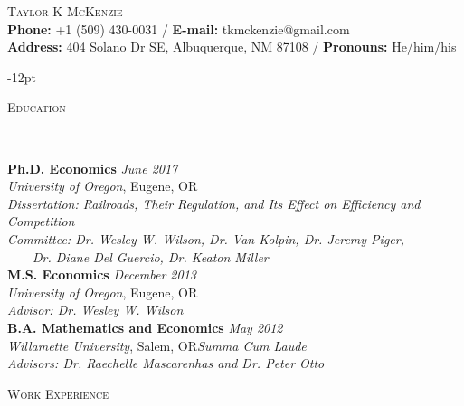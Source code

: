 \documentclass[11pt]{article}
\newenvironment{changemargin}[2]{%
  \begin{list}{}{%
    \setlength{\topsep}{0pt}%
    \setlength{\leftmargin}{#1}%
    \setlength{\rightmargin}{#2}%
    \setlength{\listparindent}{\parindent}%
    \setlength{\itemindent}{\parindent}%
    \setlength{\parsep}{\parskip}%
  }%
  \item[]}{\end{list}
}
\newcommand{\lineover}{
	\begin{changemargin}{-0.05in}{-0.05in}
		\vspace*{-8pt}
		\hrulefill \\
		\vspace*{-2pt}
	\end{changemargin}
}
\newcommand{\header}[1]{
	\begin{changemargin}{-0.5in}{-0.5in}
		\scshape{#1}\\
	\vspace*{-5pt}
  	\lineover
	\end{changemargin}
}
\newcommand{\contact}[4]{
	\begin{changemargin}{-0.5in}{-0.5in}
		\begin{center}
			{\Large \scshape {#1}}\\ \smallskip
			{#2}\\ \smallskip 
			{#3}\\ \smallskip
			{#4}\smallskip
		\end{center}
	\end{changemargin}
}
\newenvironment{body} {
	\vspace*{-16pt}
	\begin{changemargin}{-0.25in}{-0.5in}
  }	
	{\end{changemargin}
}
\begin{document}



\contact{\vspace*{-5ex}Taylor K McKenzie}{\textbf{Phone:} +1 (509) 430-0031 / \textbf{E-mail:} tkmckenzie@gmail.com}{\vspace*{-0.75ex}\textbf{Address:} 404 Solano Dr SE, Albuquerque, NM 87108 / \textbf{Pronouns:} He/him/his}

\vspace{-12pt}
\header{Education}

\begin{body}
	\vspace{14pt}
	\textbf{Ph.D. Economics}{} \hfill \emph{June 2017}{} \\
	\emph{University of Oregon}, Eugene, OR{}\\
	\emph{Dissertation: Railroads, Their Regulation, and Its Effect on Efficiency and Competition}\\
	\emph{Committee: Dr. Wesley W. Wilson, Dr. Van Kolpin, Dr. Jeremy Piger,}\\
	\ \ \ \ \emph{Dr. Diane Del Guercio, Dr. Keaton Miller}\\
	\vspace*{0pt}
	\textbf{M.S. Economics}{} \hfill \emph{December 2013}{} \\
	\emph{University of Oregon}, Eugene, OR{}\\
	\emph{Advisor: Dr. Wesley W. Wilson} \\
	\vspace*{0pt}
  	\textbf{B.A. Mathematics and Economics}{} \hfill \emph{May 2012}{} \\
	\emph{Willamette University}, Salem, OR{}\hfill \emph{Summa Cum Laude}{}\\
	\emph{Advisors: Dr. Raechelle Mascarenhas and Dr. Peter Otto} {} \hfill\\
\end{body}
\smallskip
\vspace{-6pt}
\header{Work Experience}
\end{document}
